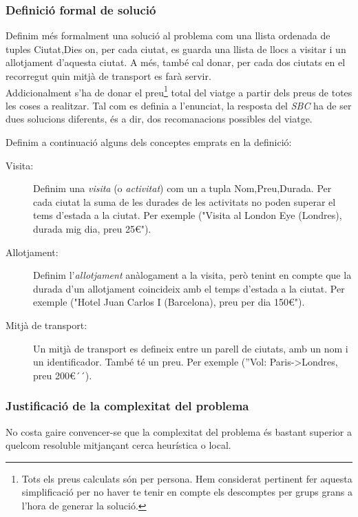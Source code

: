 \documentclass[11pt,a4paper]{article}
\begin{document}
\subsubsection{Definició formal de solució}
Definim més formalment una solució al problema com una llista ordenada de tuples \big \langle Ciutat,Dies\big \rangle{} on, per cada ciutat, es guarda una llista de llocs a visitar i un allotjament d'aquesta ciutat. A més, també cal donar, per cada dos ciutats en el recorregut quin mitjà de transport es farà servir.\\
Addicionalment s'ha de donar el preu\footnote{Tots els preus calculats són per persona. Hem considerat pertinent fer aquesta simplificació per no haver te tenir en compte els descomptes per grups grans a l'hora de generar la solució.} total del viatge a partir dels preus de totes les coses a realitzar. Tal com es definia a l'enunciat, la resposta del \emph{SBC} ha de ser dues solucions diferents, és a dir, dos recomanacions possibles del viatge.

Definim a continuació alguns dels conceptes emprats en la definició:

\begin{description}
	\item[Visita:] Definim una \emph{visita} (o \emph{activitat}) com un a tupla \big \langle Nom,Preu,Durada\big \rangle{}. Per cada ciutat la suma de les durades de les activitats no poden superar el tems d'estada a la ciutat. Per exemple ("Visita al London Eye (Londres), durada mig dia, preu 25€").
	\item[Allotjament:] Definim l'\emph{allotjament} anàlogament a la visita, però tenint en compte que la durada d'un allotjament coincideix amb el temps d'estada a la ciutat. Per exemple ("Hotel Juan Carlos I (Barcelona), preu per dia 150€").
	\item[Mitjà de transport:] Un mitjà de transport es defineix entre un parell de ciutats, amb un nom i un identificador. També té un preu. Per exemple (''Vol: Paris->Londres, preu 200€´´).
\end{description}

\subsubsection{Justificació de la complexitat del problema}
No costa gaire convencer-se que la complexitat del problema és bastant superior a quelcom resoluble mitjançant cerca heurística o local.
\end{document}
